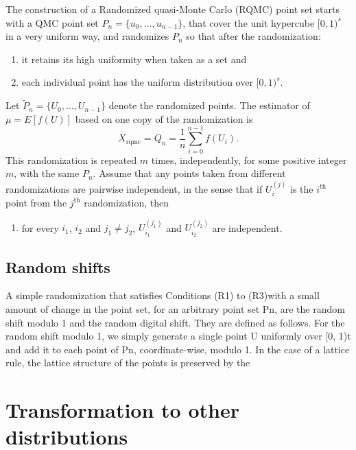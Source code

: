 The construction of a Randomized quasi-Monte Carlo (RQMC)
point set starts with a QMC point set $P_n = \lbrace u_0,\ldots, u_{n-1}
\rbrace$, that cover the unit hypercube $[0, 1)^s$ in a very uniform
way, and randomizes $P_n$ so that after the randomization:
\begin{enumerate}[(R.1)]
\item
it retains its high uniformity when taken as a set and
\item
each individual point has the uniform distribution over $[0, 1)^s$.
\end{enumerate}
Let $\tilde{P}_n = \lbrace U_0,\ldots,U_{n-1} \rbrace$ denote the randomized
points.
The estimator of $\mu = E[f(U)]$ based on one copy of the randomization
is
\[
X_{\mbox{rqmc}} = Q_n = \frac{1}{n} \sum_{i = 0}^{n-1} f(U_i).
\]
This randomization is repeated $m$ times, independently, for some positive
integer $m$, with the same $P_n$.
Assume that any points taken from different randomizations are
pairwise independent, in the sense that if $U_i^{(j)}$ is the $i^{\mbox{th}}$
point from the $j^{\mbox{th}}$ randomization, then
\begin{enumerate}[(R.3)]
\item
for every $i_1$, $i_2$ and $j_1 \ne j_2$, $U^{(j_1)}_{i_1}$ and
$U^{(j_2)}_{i_2}$ are independent.
\end{enumerate}

\subsection{Random shifts}

A simple randomization that satisfies Conditions
(R1) to (R3)with a small amount of change in the point set,
for an arbitrary point set Pn, are the random shift modulo 1 and the random
digital shift. They are defined as follows.
For the random shift modulo 1, we simply generate a single point U uniformly
over [0, 1)t and add it to each point of Pn, coordinate-wise, modulo 1. In
the case of a lattice rule, the lattice structure of the points is preserved by the

\section{Transformation to other distributions}

